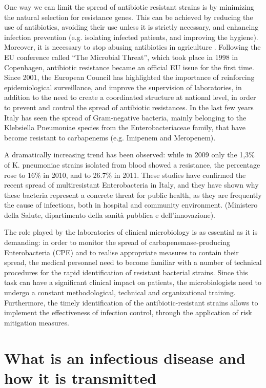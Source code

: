 \documentclass[11pt]{report}
\begin{document}
One way we can limit the spread of antibiotic resistant strains is by minimizing the natural selection for resistance genes.
This can be achieved by reducing the use of antibiotics, avoiding their use unless it is strictly necessary, and enhancing infection prevention (e.g. isolating infected patients, and improving the hygiene). Moreover, it is necessary to stop abusing antibiotics in agriculture \cite{Spellberg2014} \cite{doi:10.1093/emph/eou024}.
Following the EU conference called “The Microbial Threat”, which took place in 1998 in Copenhagen, antibiotic resistance became an official EU issue for the first time. Since 2001, the European Council has highlighted the importance of reinforcing epidemiological surveillance, and improve the supervision of laboratories, in addition to the need to create a  coordinated structure at national level, in order to prevent and control the spread of antibiotic resistances.
In the last few years Italy has seen the spread of Gram-negative bacteria, mainly belonging to the Klebsiella Pneumoniae species from the Enterobacteriaceae family, that have become resistant to carbapenems (e.g. Imipenem and Meropenem).

A dramatically increasing trend has been observed: while in 2009 only the 1,3$\%$ of K. pneumoniae strains isolated from blood showed a resistance, the percentage rose to 16$\%$ in 2010, and to 26.7$\%$ in 2011.
These studies have confirmed the recent spread of multiresistant Enterobacteria in Italy, and they have shown why these bacteria represent a concrete threat for public health, as they are frequently the cause of infections, both in hospital and community environment.
(Ministero della Salute, dipartimento della sanità pubblica e dell’innovazione).

The role played by the laboratories of clinical microbiology is as essential as it is demanding: in order to monitor the spread of carbapenemase-producing Enterobacteria (CPE) and to realise appropriate measures to contain their spread, the medical personnel need to become familiar with a number of technical procedures for the rapid identification of resistant bacterial strains. Since this task can have a significant clinical impact on patients, the microbiologists need to undergo a constant methodological, technical and organizational training. Furthermore, the timely identification of the antibiotic-resistant strains allows to implement the effectiveness of infection control, through the application of risk mitigation measures.


\section{What is an infectious disease and how it is transmitted}
\end{document}
